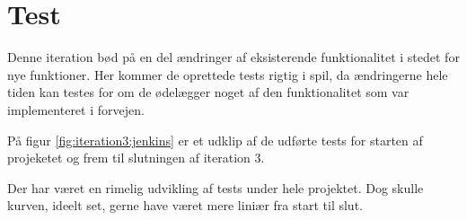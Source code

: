 \section{Test}

Denne iteration bød på en del ændringer af eksisterende funktionalitet i stedet for nye funktioner. Her kommer de oprettede tests rigtig i spil, da ændringerne hele tiden kan testes for om de ødelægger noget af den funktionalitet som var implementeret i forvejen.

På figur \ref{fig:iteration3:jenkins} er et udklip af de udførte tests for starten af projeketet og frem til slutningen af iteration 3.


Der har været en rimelig udvikling af tests under hele projektet. Dog skulle kurven, ideelt set, gerne have været mere liniær fra start til slut.